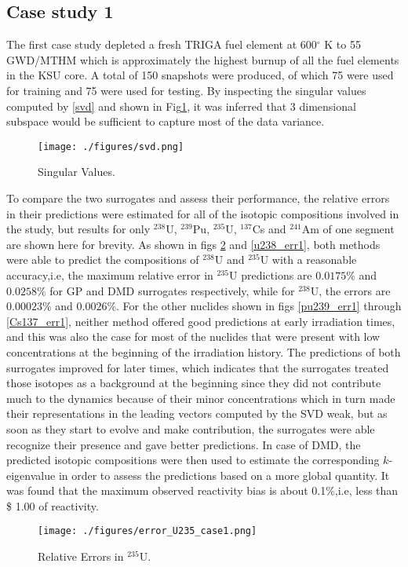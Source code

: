 \documentclass{anstrans}
\begin{document}
\subsection{Case study 1}
The first case study depleted a fresh TRIGA fuel element at 600$^{\circ}$ K to 55 GWD/MTHM which is approximately the highest burnup of all the fuel elements in the KSU core.  A total of 150 snapshots were produced, of which 75  were used for training and 75 were used for testing.
By inspecting the singular values computed by \eqref{svd} and shown in Fig\ref{fig:svd}, it was inferred that 3 dimensional subspace would be sufficient to capture most of the data variance.
\begin{figure}[!htb] 
  \centering
  \texttt{[image: ./figures/svd.png]}
  \caption{Singular Values.}
  \label{fig:svd}
\end{figure}
To compare the two surrogates and assess their performance, the relative errors in their predictions were estimated for all of the isotopic compositions involved in the study, but results for only ${}^{238}$U, ${}^{239}$Pu, ${}^{235}$U, ${}^{137}$Cs and ${}^{241}$Am of one segment are shown here for brevity.
As shown in figs \ref{u235_err1} and \ref{u238_err1}, both methods were able to predict the compositions of ${}^{238}$U and ${}^{235}$U with a reasonable accuracy,i.e, the maximum relative error in ${}^{235}$U predictions are $0.0175\%$ and $0.0258\%$ for GP and DMD surrogates respectively, while for ${}^{238}$U, the errors are $0.00023\%$ and $0.0026\%$. 
For the other nuclides shown in figs \ref{pu239_err1} through \ref{Cs137_err1}, neither method offered good predictions at early irradiation times, and this was also the case for most of the nuclides that were present with low concentrations at the beginning of the irradiation history. The predictions of both surrogates improved for later times, which indicates that the surrogates treated those isotopes as a background at the beginning since they did not contribute much to the dynamics because of their minor concentrations which in turn made their representations in the leading vectors computed by the SVD weak, but as soon as they start to evolve and make contribution, the surrogates were able recognize their presence and gave better predictions.
In case of DMD, the predicted isotopic compositions were then used to estimate the corresponding $k$-eigenvalue in order to assess the predictions based on a more global quantity. It was found that the maximum observed reactivity bias is about 0.1\%,i.e,  less than \$ 1.00 of reactivity. 
\begin{figure}[!htb] 
  \centering
  \texttt{[image: ./figures/error\_U235\_case1.png]}
  \caption{Relative Errors in ${}^{235}$U.}
  \label{u235_err1}
\end{figure}
\end{document}
